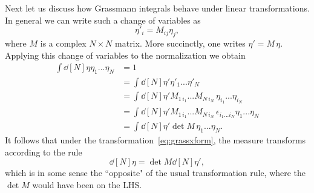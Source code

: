 Next let us discuss how Grassmann integrals behave under linear
transformations. In general we can write such a change of variables as
\begin{equation}\label{eq:grassxform}
  \eta'_i=M_{ij}\eta_j,
\end{equation}
where $M$ is a complex $N\times N$ matrix. More succinctly, one writes 
$\eta'=M\,\eta$. Applying this change of variables to the normalization
 we obtain
\begin{equation}\begin{aligned}
  \int\dd[N]{\eta}\eta_1...\eta_N
     &=1\\
     &=\int\dd[N]{\eta'}\eta'_1...\eta'_N\\
     &=\int\dd[N]{\eta'}M_{1\,i_1}...M_{N\,i_N}\,\eta_{i_1}...\eta_{i_N}\\
     &=\int\dd[N]{\eta'}M_{1\,i_1}...M_{N\,i_N}\,\epsilon_{i_1...i_N}
               \eta_1...\eta_N\\
     &=\int\dd[N]{\eta'}\det M\,\eta_1...\eta_N.
\end{aligned}\end{equation}
It follows that under the transformation~\eqref{eq:grassxform}, the measure
transforms according to the rule
\begin{equation}
  \dd[N]{\eta}=\det M\dd[N]{\eta'},
\end{equation}
which is in some sense the ``opposite" of the usual transformation rule, where
the $\det M$ would have been on the LHS.

